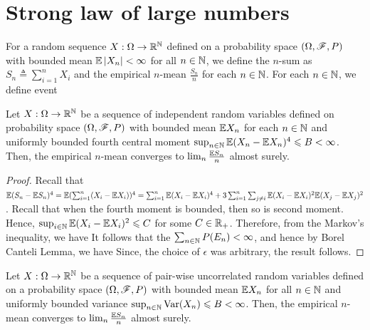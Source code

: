 \documentclass[letterpaper,10pt,english]{article}
\begin{document}
\section{Strong law of large numbers}
\begin{defn} 
For a random sequence $X:\Omega\to\mathbb{R}^{\mathbb{N}}$ defined on a probability space $(\Omega,\mathscr{F},P)$ with bounded mean $\mathbb{E}\left\lvert X_n\right\rvert < \infty$ for all $n \in \mathbb{N}$, 
we define the $n$-sum as $S_n \triangleq \sum_{i=1}^nX_i$ and the empirical $n$-mean $\frac{S_n}{n}$ for each $n \in \mathbb{N}$. 
For each $n \in \mathbb{N}$, we define event 
\end{defn}
\begin{thm} 
Let $X:\Omega\to\mathbb{R}^{\mathbb{N}}$ be a sequence of independent random variables defined on probability space $(\Omega,\mathscr{F},P)$ with bounded mean $\mathbb{E} X_n$ for each $n \in \mathbb{N}$ and uniformly bounded fourth central moment $\sup_{n \in \mathbb{N}}\mathbb{E}(X_n-\mathbb{E} X_n)^4 \leqslant B < \infty$. %
Then, the empirical $n$-mean converges to $\lim_n\frac{\mathbb{E} S_n}{n}$ almost surely.
\end{thm}
\begin{proof}
Recall that $\mathbb{E}(S_n-\mathbb{E} S_n)^4 = \mathbb{E}(\sum_{i=1}^n(X_i-\mathbb{E} X_i))^4 = \sum_{i=1}^n\mathbb{E}(X_i-\mathbb{E} X_i)^4 + 3\sum_{i=1}^n\sum_{j \neq i}\mathbb{E}(X_i-\mathbb{E} X_i)^2\mathbb{E}(X_j-\mathbb{E} X_j)^2$. 
Recall that when the fourth moment is bounded, then so is second moment. 
Hence, $\sup_{i\in \mathbb{N}}\mathbb{E}(X_i-\mathbb{E} X_i)^2 \leqslant C$ for some $C \in \mathbb{R}_+$.
Therefore, from the Markov's inequality, we have %
It follows that the $\sum_{n \in \mathbb{N}}P(E_n) < \infty$, and hence by Borel Canteli Lemma, we have 
Since, the choice of $\epsilon$ was arbitrary, the result follows.
\end{proof}
\begin{thm} 
Let $X:\Omega \to \mathbb{R}^{\mathbb{N}}$ be a sequence of pair-wise uncorrelated random variables defined on a probability space $(\Omega, \mathscr{F}, P)$ with bounded mean $\mathbb{E} X_n$ for all $n \in \mathbb{N}$ and uniformly bounded variance $\sup_{n\in\mathbb{N}}\operatorname{Var}(X_n) \leqslant B < \infty$. %
Then, the empirical $n$-mean converges to $\lim_n\frac{\mathbb{E} S_n}{n}$ almost surely.
\end{thm}
\end{document}
